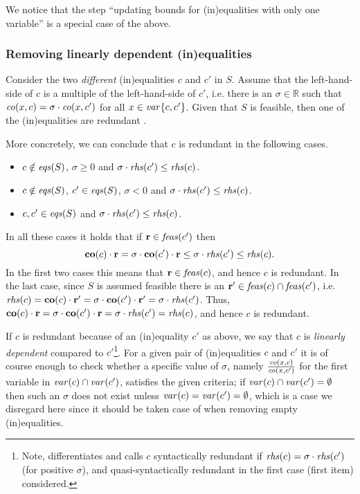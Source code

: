 We notice that the step ``updating bounds for (in)equalities with only one variable'' is a special case of the above.
%
\subsubsection{Removing linearly dependent (in)equalities}
Consider the two \emph{different} (in)equalities $c$ and $c'$ in $S$. 
Assume that the left-hand-side of $c$ is a multiple of the left-hand-side of $c'$, i.e. there is an $\sigma\in \mathbb{R}$ such that $\mathit{co}(x,c) = \sigma\cdot\mathit{co}(x,c')$ for all $x\in\mathit{var}\{c,c'\}$. Given that $S$ is feasible, then one of the (in)equalities are redundant \cite{lassez93}. 
 
More concretely, we can conclude that $c$ is redundant in the following cases.

\begin{itemize}
\item $c\notin \mathit{eqs}(S)$, $\sigma\geq 0$ and $\sigma\cdot \mathit{rhs}(c')\leq \mathit{rhs}(c)$. 
\item $c\notin \mathit{eqs}(S)$, $c'\in \mathit{eqs}(S)$, $\sigma<0$ and  $\sigma\cdot \mathit{rhs}(c')\leq \mathit{rhs}(c)$. 
\item $c,c'\in \mathit{eqs}(S)$ and $\sigma\cdot \mathit{rhs}(c')\leq \mathit{rhs}(c)$. 
\end{itemize}
In all these cases it holds that if $\mathbf{r}\in\mathit{feas}(c')$ then 
\begin{equation}\label{eq:3cases}
\mathbf{co}(c)\cdot \mathbf{r} = \sigma\cdot \mathbf{co}(c')\cdot \mathbf{r} \leq \sigma \cdot \mathit{rhs}(c')\leq  \mathit{rhs}(c).
\end{equation}
In the first two cases this means that $\mathbf{r}\in\mathit{feas}(c)$, and hence $c$ is redundant. In the last case, since $S$ is assumed feasible there is an $\mathbf{r}'\in\mathit{feas}(c)\cap\mathit{feas}(c')$, i.e. $\mathit{rhs}(c)=\mathbf{co}(c)\cdot\mathbf{r}'=\sigma\cdot\mathbf{co}(c')\cdot \mathbf{r}' = \sigma\cdot \mathit{rhs}(c')$. Thus, $\mathbf{co}(c)\cdot\mathbf{r}=\sigma\cdot\mathbf{co}(c')\cdot\mathbf{r}=\sigma\cdot\mathit{rhs}(c')=\mathit{rhs}(c)$, and hence $c$ is redundant. 

If $c$ is redundant because of an (in)equality $c'$ as above, we say that $c$ is \emph{linearly dependent} compared to $c'$\footnote{Note, \cite{lassez93} differentiates and  calls $c$ syntactically redundant if $\mathit{rhs}(c)=\sigma\cdot\mathit{rhs}(c')$ (for positive $\sigma$), and quasi-syntactically redundant in the first case (first item) considered.}.
For a given pair of (in)equalities $c$ and $c'$ it is of course enough to check whether a specific value of $\sigma$, namely $\frac{\mathit{co}(x,c)}{\mathit{co}(x,c')}$ for the first variable in $\mathit{var}(c)\cap\mathit{var}(c')$, satisfies the given criteria; if $\mathit{var}(c)\cap\mathit{var}(c') = \emptyset$ then such an $\sigma$ does not exist unless $\mathit{var}(c)=\mathit{var}(c')=\emptyset$, which is a case we disregard here since it should be taken case of when removing empty (in)equalities.
%


